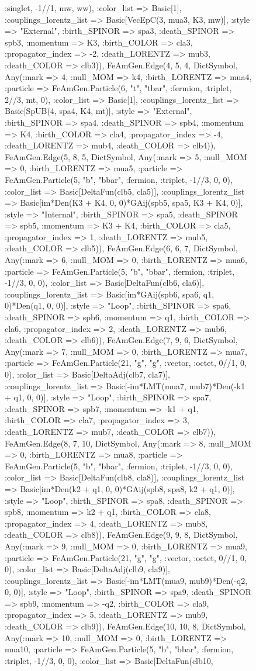 \documentclass{revtex4}
\begin{document}
\begin{figure}[!htb]
\begin{center}
{:singlet, -1//1, mw, ww), :color_list => Basic[1], :couplings_lorentz_list => Basic[VecEpC(3, mua3, K3, mw)], :style => "External", :birth_SPINOR => spa3, :death_SPINOR => spb3, :momentum => K3, :birth_COLOR => cla3, :propagator_index => -2, :death_LORENTZ => mub3, :death_COLOR => clb3)), FeAmGen.Edge(4, 5, 4, Dict{Symbol, Any}(:mark => 4, :null_MOM => k4, :birth_LORENTZ => mua4, :particle => FeAmGen.Particle(6, "t", "tbar", :fermion, :triplet, 2//3, mt, 0), :color_list => Basic[1], :couplings_lorentz_list => Basic[SpUB(4, spa4, K4, mt)], :style => "External", :birth_SPINOR => spa4, :death_SPINOR => spb4, :momentum => K4, :birth_COLOR => cla4, :propagator_index => -4, :death_LORENTZ => mub4, :death_COLOR => clb4)), FeAmGen.Edge(5, 8, 5, Dict{Symbol, Any}(:mark => 5, :null_MOM => 0, :birth_LORENTZ => mua5, :particle => FeAmGen.Particle(5, "b", "bbar", :fermion, :triplet, -1//3, 0, 0), :color_list => Basic[DeltaFun(clb5, cla5)], :couplings_lorentz_list => Basic[im*Den(K3 + K4, 0, 0)*GAij(spb5, spa5, K3 + K4, 0)], :style => "Internal", :birth_SPINOR => spa5, :death_SPINOR => spb5, :momentum => K3 + K4, :birth_COLOR => cla5, :propagator_index => 1, :death_LORENTZ => mub5, :death_COLOR => clb5)), FeAmGen.Edge(6, 6, 7, Dict{Symbol, Any}(:mark => 6, :null_MOM => 0, :birth_LORENTZ => mua6, :particle => FeAmGen.Particle(5, "b", "bbar", :fermion, :triplet, -1//3, 0, 0), :color_list => Basic[DeltaFun(clb6, cla6)], :couplings_lorentz_list => Basic[im*GAij(spb6, spa6, q1, 0)*Den(q1, 0, 0)], :style => "Loop", :birth_SPINOR => spa6, :death_SPINOR => spb6, :momentum => q1, :birth_COLOR => cla6, :propagator_index => 2, :death_LORENTZ => mub6, :death_COLOR => clb6)), FeAmGen.Edge(7, 9, 6, Dict{Symbol, Any}(:mark => 7, :null_MOM => 0, :birth_LORENTZ => mua7, :particle => FeAmGen.Particle(21, "g", "g", :vector, :octet, 0//1, 0, 0), :color_list => Basic[DeltaAdj(clb7, cla7)], :couplings_lorentz_list => Basic[-im*LMT(mua7, mub7)*Den(-k1 + q1, 0, 0)], :style => "Loop", :birth_SPINOR => spa7, :death_SPINOR => spb7, :momentum => -k1 + q1, :birth_COLOR => cla7, :propagator_index => 3, :death_LORENTZ => mub7, :death_COLOR => clb7)), FeAmGen.Edge(8, 7, 10, Dict{Symbol, Any}(:mark => 8, :null_MOM => 0, :birth_LORENTZ => mua8, :particle => FeAmGen.Particle(5, "b", "bbar", :fermion, :triplet, -1//3, 0, 0), :color_list => Basic[DeltaFun(clb8, cla8)], :couplings_lorentz_list => Basic[im*Den(k2 + q1, 0, 0)*GAij(spb8, spa8, k2 + q1, 0)], :style => "Loop", :birth_SPINOR => spa8, :death_SPINOR => spb8, :momentum => k2 + q1, :birth_COLOR => cla8, :propagator_index => 4, :death_LORENTZ => mub8, :death_COLOR => clb8)), FeAmGen.Edge(9, 9, 8, Dict{Symbol, Any}(:mark => 9, :null_MOM => 0, :birth_LORENTZ => mua9, :particle => FeAmGen.Particle(21, "g", "g", :vector, :octet, 0//1, 0, 0), :color_list => Basic[DeltaAdj(clb9, cla9)], :couplings_lorentz_list => Basic[-im*LMT(mua9, mub9)*Den(-q2, 0, 0)], :style => "Loop", :birth_SPINOR => spa9, :death_SPINOR => spb9, :momentum => -q2, :birth_COLOR => cla9, :propagator_index => 5, :death_LORENTZ => mub9, :death_COLOR => clb9)), FeAmGen.Edge(10, 10, 8, Dict{Symbol, Any}(:mark => 10, :null_MOM => 0, :birth_LORENTZ => mua10, :particle => FeAmGen.Particle(5, "b", "bbar", :fermion, :triplet, -1//3, 0, 0), :color_list => Basic[DeltaFun(clb10, }
\end{center}
\end{figure}
\end{document}
